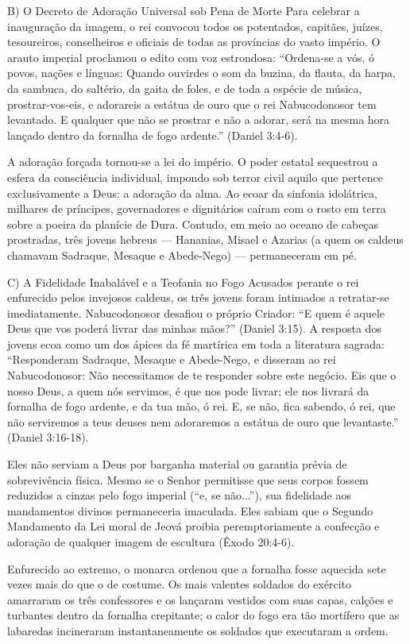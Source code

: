 \documentclass[11pt,a4paper,openany]{book}
\begin{document}
B) O Decreto de Adoração Universal sob Pena de Morte
Para celebrar a inauguração da imagem, o rei convocou todos os potentados, capitães, juízes, tesoureiros, conselheiros e oficiais de todas as províncias do vasto império. O arauto imperial proclamou o edito com voz estrondosa:
``Ordena-se a vós, ó povos, nações e línguas: Quando ouvirdes o som da buzina, da flauta, da harpa, da sambuca, do saltério, da gaita de foles, e de toda a espécie de música, prostrar-vos-eis, e adorareis a estátua de ouro que o rei Nabucodonosor tem levantado. E qualquer que não se prostrar e não a adorar, será na mesma hora lançado dentro da fornalha de fogo ardente.'' (Daniel 3:4-6).

A adoração forçada tornou-se a lei do império. O poder estatal sequestrou a esfera da consciência individual, impondo sob terror civil aquilo que pertence exclusivamente a Deus: a adoração da alma. Ao ecoar da sinfonia idolátrica, milhares de príncipes, governadores e dignitários caíram com o rosto em terra sobre a poeira da planície de Dura. Contudo, em meio ao oceano de cabeças prostradas, três jovens hebreus — Hananias, Misael e Azarias (a quem os caldeus chamavam Sadraque, Mesaque e Abede-Nego) — permaneceram em pé.

C) A Fidelidade Inabalável e a Teofania no Fogo
Acusados perante o rei enfurecido pelos invejosos caldeus, os três jovens foram intimados a retratar-se imediatamente. Nabucodonosor desafiou o próprio Criador: ``E quem é aquele Deus que vos poderá livrar das minhas mãos?'' (Daniel 3:15).
A resposta dos jovens ecoa como um dos ápices da fé martírica em toda a literatura sagrada:
``Responderam Sadraque, Mesaque e Abede-Nego, e disseram ao rei Nabucodonosor: Não necessitamos de te responder sobre este negócio. Eis que o nosso Deus, a quem nós servimos, é que nos pode livrar; ele nos livrará da fornalha de fogo ardente, e da tua mão, ó rei. E, se não, fica sabendo, ó rei, que não serviremos a teus deuses nem adoraremos a estátua de ouro que levantaste.'' (Daniel 3:16-18).

Eles não serviam a Deus por barganha material ou garantia prévia de sobrevivência física. Mesmo se o Senhor permitisse que seus corpos fossem reduzidos a cinzas pelo fogo imperial (``e, se não...''), sua fidelidade aos mandamentos divinos permaneceria imaculada. Eles sabiam que o Segundo Mandamento da Lei moral de Jeová proibia peremptoriamente a confecção e adoração de qualquer imagem de escultura (Êxodo 20:4-6).

Enfurecido ao extremo, o monarca ordenou que a fornalha fosse aquecida sete vezes mais do que o de costume. Os mais valentes soldados do exército amarraram os três confessores e os lançaram vestidos com suas capas, calções e turbantes dentro da fornalha crepitante; o calor do fogo era tão mortífero que as labaredas incineraram instantaneamente os soldados que executaram a ordem.
\end{document}
